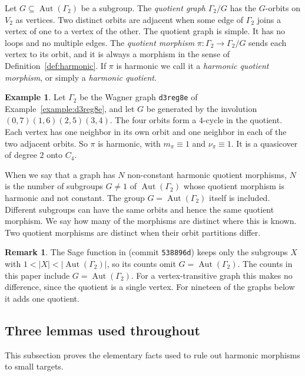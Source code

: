 \documentclass[12pt,letterpaper]{article}
\theoremstyle{definition}
\newtheorem{example}[theorem]{Example}
\newtheorem{remark}[theorem]{Remark}
\DeclareMathOperator{\Aut}{Aut}
\begin{document}
Let $G\subseteq\Aut(\Gamma_2)$ be a subgroup. The {\it quotient graph}
$\Gamma_2/G$ has the $G$-orbits on $V_2$ as vertices. Two distinct orbits
are adjacent when some edge of $\Gamma_2$ joins a vertex of one to a vertex of
the other. The quotient graph is simple. It has no loops and no multiple
edges. The {\it quotient morphism} $\pi:\Gamma_2\to\Gamma_2/G$ sends each
vertex to its orbit, and it is always a morphism in the sense of
Definition~\ref{def:harmonic}. If $\pi$ is harmonic we call it a
{\it harmonic quotient morphism}, or simply a {\it harmonic quotient}.

\begin{example}
\label{example:quotient-intro}
Let $\Gamma_2$ be the Wagner graph {\tt d3reg8e} of
Example~\ref{example:d3reg8e}, and let $G$ be generated by the involution
$(0,7)(1,6)(2,5)(3,4)$. The four orbits form a $4$-cycle in the quotient.
Each vertex has one neighbor in its own orbit and one neighbor in each of
the two adjacent orbits. So $\pi$ is harmonic, with $m_\pi\equiv 1$ and
$\nu_\pi\equiv 1$. It is a quasicover of degree $2$ onto $C_4$.
\end{example}

When we say that a graph has $N$ non-constant harmonic quotient morphisms,
$N$ is the number of subgroups $G\neq 1$ of $\Aut(\Gamma_2)$ whose quotient
morphism is harmonic and not constant. The group $G=\Aut(\Gamma_2)$ itself is
included. Different subgroups can have the same orbits and hence the same
quotient morphism. We say how many of the morphisms are distinct where this
is known. Two quotient morphisms are distinct when their orbit partitions
differ.

\begin{remark}
\label{rem:full-group}
The Sage function  in
 (commit {\tt 538896d}) keeps only the subgroups
$X$ with $1<|X|<|\Aut(\Gamma_2)|$, so its counts omit $G=\Aut(\Gamma_2)$.
The counts in this paper include $G=\Aut(\Gamma_2)$. For a
vertex-transitive graph this makes no difference, since the quotient is a
single vertex. For nineteen of the graphs below it adds one quotient.
\end{remark}

\subsection{Three lemmas used throughout}
\label{sec:lemmas}

This subsection proves the elementary facts used to rule out harmonic
morphisms to small targets.
\end{document}
